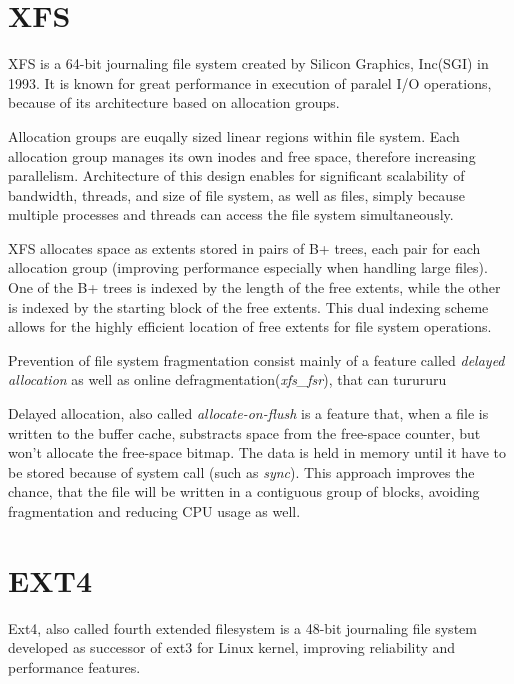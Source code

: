 \documentclass[
  color, %
  table, %
  lof,   %
  lot,   %
]{fithesis3}
\begin{document}
\section{XFS}
XFS is a 64-bit journaling file system created by Silicon Graphics, Inc(SGI) in 1993. It is known for great performance in execution of paralel I/O operations, because of its architecture based on allocation groups.

Allocation groups are euqally sized linear regions within file system. Each allocation group manages its own inodes and free space, therefore increasing parallelism.
Architecture of this design enables for significant scalability of bandwidth, threads, and size of file system, as well as files, simply because multiple processes and threads can access the file system simultaneously.

XFS allocates space as extents stored in pairs of B+ trees, each pair for each allocation group (improving performance especially when handling large files). One of the B+ trees is indexed by the length of the free extents, while the other is indexed by the starting block of the free extents. This dual indexing scheme allows for the highly efficient location of free extents for file system operations.

Prevention of file system fragmentation consist mainly of a feature called \textit{delayed allocation} as well as online defragmentation(\textit{xfs\_fsr}), that can turururu

Delayed allocation, also called \textit{allocate-on-flush} is a feature that, when a file is written to the buffer cache, substracts space from the free-space counter, but won't allocate the free-space bitmap. The data is held in memory until it have to be stored because of system call (such as \textit{sync}). This approach improves the chance, that the file will be written in a contiguous group of blocks, avoiding fragmentation and reducing CPU usage as well.

\section{EXT4}
Ext4, also called fourth extended filesystem is a 48-bit journaling file system developed as successor of ext3 for Linux kernel, improving reliability and performance features.

\end{document}
